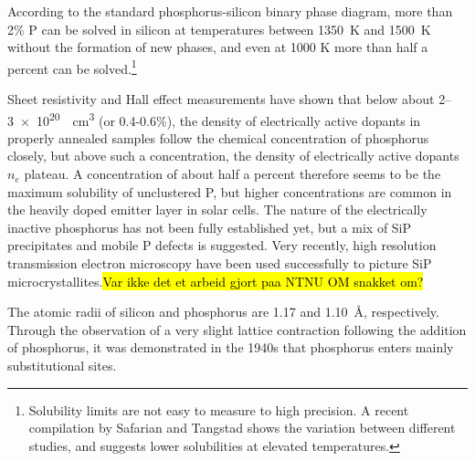 \documentclass[11pt,bibliography=totoc,index=totoc]{scrbook}   %
\newcommand{\comment}[1]{\hl{#1}}
\begin{document}
According to the standard phosphorus-silicon binary phase diagram,\cite{PSiPhaseDiagram} more than 2\% P can be solved in silicon at temperatures between \SI{1350}{\kelvin} and \SI{1500}{\kelvin} without the formation of new phases, and even at 1000 K more than half a percent can be solved.\footnote{Solubility limits are not easy to measure to high precision. A recent compilation by Safarian and Tangstad shows the variation between different studies, and suggests lower solubilities at elevated temperatures.\cite{Safarian:2011}}

Sheet resistivity and Hall effect measurements have shown that below about 2–\SI{3e20}{\per\centi\metre\cubed} (or 0.4-0.6\%), the density of electrically active dopants in properly annealed samples follow the chemical concentration of phosphorus closely, but above such a concentration, the density of electrically active dopants $n_e$ plateau.\cite{Tannenbaum:1961}
A concentration of about half a percent therefore seems to be the maximum solubility of unclustered P,\cite{Solmi:1998} but higher concentrations
are common in the heavily doped emitter layer in solar cells.\cite{Bentzen:2006b}
The nature of the electrically inactive phosphorus has not been fully established yet, but a mix of SiP precipitates and mobile P defects is suggested.\cite{Armigliato:1976}\cite{Solmi:1996} 
Very recently, high resolution transmission electron microscopy have been used successfully to picture SiP microcrystallites.\comment{Var ikke det et arbeid gjort paa NTNU OM snakket om?}


The atomic radii of silicon and phosphorus are 1.17 and 1.10~Å, respectively.
Through the observation of a very slight lattice contraction following the addition of phosphorus,
it was demonstrated in the 1940s that phosphorus enters mainly substitutional sites.\cite{Pearson:1949}

\end{document}
